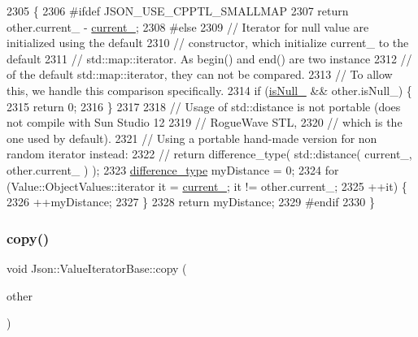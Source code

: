 \begin{DoxyCode}
2305                                                               \{
2306 \textcolor{preprocessor}{#ifdef JSON\_USE\_CPPTL\_SMALLMAP}
2307   \textcolor{keywordflow}{return} other.current\_ - \hyperlink{class_json_1_1_value_iterator_base_ab3138ce8af8301cca3b041ea55cb922a}{current\_};
2308 \textcolor{preprocessor}{#else}
2309   \textcolor{comment}{// Iterator for null value are initialized using the default}
2310   \textcolor{comment}{// constructor, which initialize current\_ to the default}
2311   \textcolor{comment}{// std::map::iterator. As begin() and end() are two instance}
2312   \textcolor{comment}{// of the default std::map::iterator, they can not be compared.}
2313   \textcolor{comment}{// To allow this, we handle this comparison specifically.}
2314   \textcolor{keywordflow}{if} (\hyperlink{class_json_1_1_value_iterator_base_a3e08b114a1aed9bde518c527f94a8c59}{isNull\_} && other.isNull\_) \{
2315     \textcolor{keywordflow}{return} 0;
2316   \}
2317 
2318   \textcolor{comment}{// Usage of std::distance is not portable (does not compile with Sun Studio 12}
2319   \textcolor{comment}{// RogueWave STL,}
2320   \textcolor{comment}{// which is the one used by default).}
2321   \textcolor{comment}{// Using a portable hand-made version for non random iterator instead:}
2322   \textcolor{comment}{//   return difference\_type( std::distance( current\_, other.current\_ ) );}
2323   \hyperlink{class_json_1_1_value_iterator_base_a4e44bf8cbd17ec8d6e2c185904a15ebd}{difference\_type} myDistance = 0;
2324   \textcolor{keywordflow}{for} (Value::ObjectValues::iterator it = \hyperlink{class_json_1_1_value_iterator_base_ab3138ce8af8301cca3b041ea55cb922a}{current\_}; it != other.current\_;
2325        ++it) \{
2326     ++myDistance;
2327   \}
2328   \textcolor{keywordflow}{return} myDistance;
2329 \textcolor{preprocessor}{#endif}
2330 \}
\end{DoxyCode}
\mbox{\label{class_json_1_1_value_iterator_base_a496e6aba44808433ec5858c178be5719}} 
\subsubsection{\texorpdfstring{copy()}{copy()}}
{\footnotesize\ttfamily void Json\+::\+Value\+Iterator\+Base\+::copy (\begin{DoxyParamCaption}\item[{const \hyperlink{class_json_1_1_value_iterator_base_a9d2a940d03ea06d20d972f41a89149ee}{Self\+Type} \&}]{other }\end{DoxyParamCaption})\hspace{0.3cm}{\ttfamily [protected]}}



